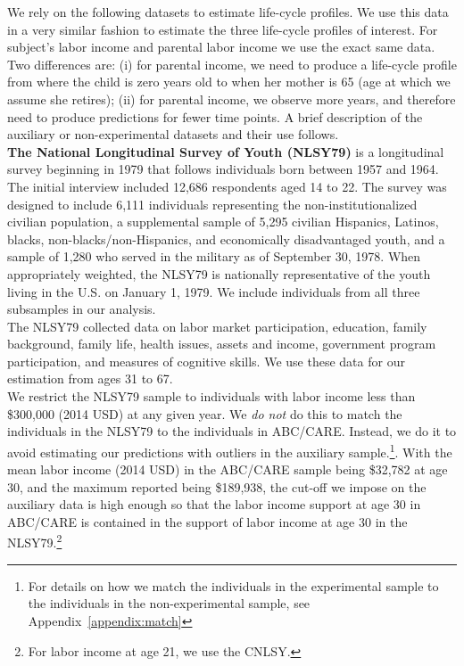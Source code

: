 \noindent We rely on the following datasets to estimate life-cycle profiles. We use this data in a very similar fashion to estimate the three life-cycle profiles of interest. For subject's labor income and parental labor income we use the exact same data. Two differences are: (i) for parental income, we need to produce a life-cycle profile from where the child is zero years old to when her mother is 65 (age at which we assume she retires); (ii) for parental income, we observe more years, and therefore need to produce predictions for fewer time points. A brief description of the auxiliary or non-experimental datasets and their use follows.\\

\noindent \textbf{The National Longitudinal Survey of Youth (NLSY79)} is a longitudinal survey beginning in 1979 that follows individuals born between 1957 and 1964. The initial interview included 12,686 respondents aged 14 to 22. The survey was designed to include 6,111 individuals representing the non-institutionalized civilian population, a supplemental sample of 5,295 civilian Hispanics, Latinos, blacks, non-blacks/non-Hispanics, and economically disadvantaged youth, and a sample of 1,280 who served in the military as of September 30, 1978. When appropriately weighted, the NLSY79 is nationally representative of the youth living in the U.S. on January 1, 1979. We include individuals from all three subsamples in our analysis. \\

\noindent The NLSY79 collected data on labor market participation, education, family background, family life, health issues, assets and income, government program participation, and measures of cognitive skills. We use these data for our estimation from ages 31 to 67.\\

\noindent We restrict the NLSY79 sample to individuals with labor income less than \$300,000 (2014 USD) at any given year. We \textit{do not} do this to match the individuals in the NLSY79 to the individuals in ABC/CARE. Instead, we do it to avoid estimating our predictions with outliers in the auxiliary sample.\footnote{For details on how we match the individuals in the experimental sample to the individuals in the non-experimental sample, see Appendix~\ref{appendix:match}}. With the mean labor income (2014 USD) in the ABC/CARE sample being \$32,782 at age 30, and the maximum reported being \$189,938, the cut-off we impose on the auxiliary data is high enough so that the labor income support at age 30 in ABC/CARE is contained in the support of labor income at age 30 in the NLSY79.\footnote{For labor income at age 21, we use the CNLSY.}\\

